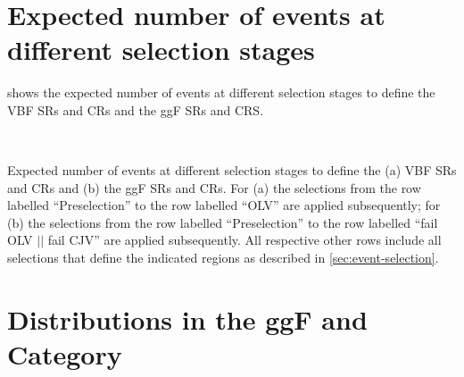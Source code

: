     \FloatBarrier
    \section{Expected number of events at different selection stages}
    \label{app:cutflows}

     shows the expected number of events at different selection stages to define the VBF \TwoJet SRs and CRs and the ggF \TwoJet SRs and CRS.

    \begin{landscape}
        \thispagestyle{empty}
        \begin{table}
            \subfloat[]{
                \resizebox{\textwidth}{!}{
                    
                }
            } \\
            \vspace{20pt}
            \subfloat[]{
                \resizebox{\textwidth}{!}{
                    
                }
            }
            \caption{Expected number of events at different selection stages to define the (a) VBF \TwoJet SRs and CRs and (b) the ggF \TwoJet SRs and CRs. For (a) the selections from the row labelled ``Preselection'' to the row labelled ``OLV'' are applied subsequently; for (b) the selections from the row labelled ``Preselection'' to the row labelled ``fail OLV $||$ fail CJV'' are applied subsequently. All respective other rows include all selections that define the indicated regions as described in \cref{sec:event-selection}.}
            \label{app:tab:cutflows}
        \end{table}
    \end{landscape}



    \clearpage
    \FloatBarrier
    \section{Distributions in the ggF \ZeroJet and \OneJet Category}
    \label{app:event-selection-ggf}

